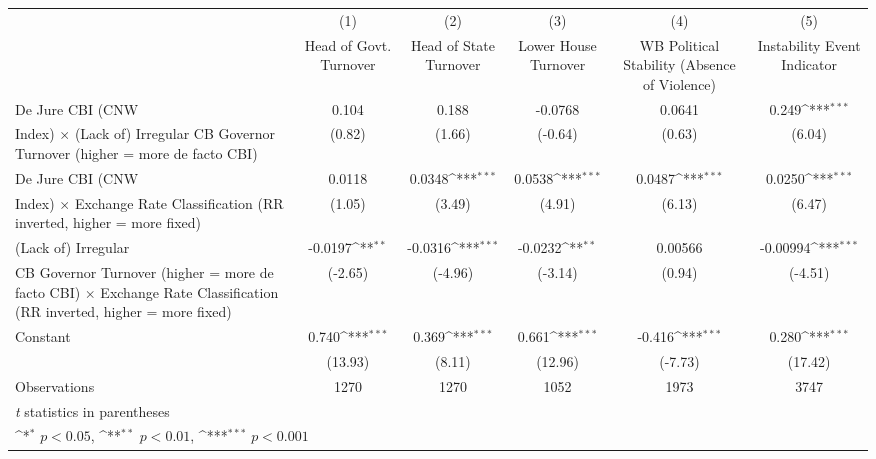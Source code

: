 {
\def\sym#1{\ifmmode^{#1}\else\(^{#1}\)\fi}
\begin{tabular}{l*{5}{c}}
\hline\hline
                    &\multicolumn{1}{c}{(1)}&\multicolumn{1}{c}{(2)}&\multicolumn{1}{c}{(3)}&\multicolumn{1}{c}{(4)}&\multicolumn{1}{c}{(5)}\\
                    &\multicolumn{1}{c}{Head of Govt. Turnover}&\multicolumn{1}{c}{Head of State Turnover}&\multicolumn{1}{c}{Lower House Turnover}&\multicolumn{1}{c}{WB Political Stability (Absence of Violence)}&\multicolumn{1}{c}{Instability Event Indicator}\\
\hline
De Jure CBI (CNW    &       0.104         &       0.188         &     -0.0768         &      0.0641         &       0.249\sym{***}\\
Index) $\times$ (Lack of) Irregular CB Governor Turnover (higher = more de facto CBI)&      (0.82)         &      (1.66)         &     (-0.64)         &      (0.63)         &      (6.04)         \\
[1em]
De Jure CBI (CNW    &      0.0118         &      0.0348\sym{***}&      0.0538\sym{***}&      0.0487\sym{***}&      0.0250\sym{***}\\
Index) $\times$ Exchange Rate Classification (RR inverted, higher = more fixed)&      (1.05)         &      (3.49)         &      (4.91)         &      (6.13)         &      (6.47)         \\
[1em]
(Lack of) Irregular &     -0.0197\sym{**} &     -0.0316\sym{***}&     -0.0232\sym{**} &     0.00566         &    -0.00994\sym{***}\\
CB Governor Turnover (higher = more de facto CBI) $\times$ Exchange Rate Classification (RR inverted, higher = more fixed)&     (-2.65)         &     (-4.96)         &     (-3.14)         &      (0.94)         &     (-4.51)         \\
[1em]
Constant            &       0.740\sym{***}&       0.369\sym{***}&       0.661\sym{***}&      -0.416\sym{***}&       0.280\sym{***}\\
                    &     (13.93)         &      (8.11)         &     (12.96)         &     (-7.73)         &     (17.42)         \\
\hline
Observations        &        1270         &        1270         &        1052         &        1973         &        3747         \\
\hline\hline
\multicolumn{6}{l}{\footnotesize \textit{t} statistics in parentheses}\\
\multicolumn{6}{l}{\footnotesize \sym{*} \(p<0.05\), \sym{**} \(p<0.01\), \sym{***} \(p<0.001\)}\\
\end{tabular}
}
